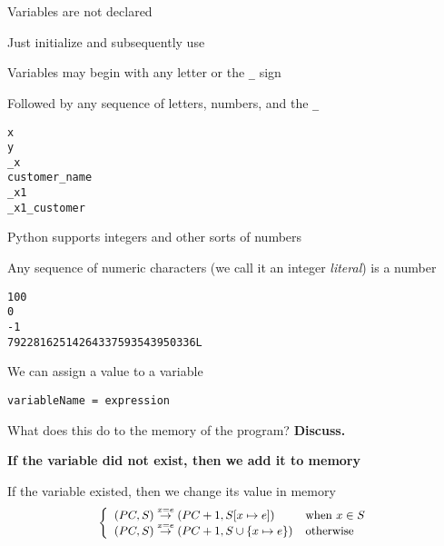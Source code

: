 \documentclass{beamer}
\begin{document}
\begin{slide}{
\item Variables are not declared
\item Just initialize and subsequently use
}\end{slide}

\begin{slide}{
\item Variables may begin with any letter or the \texttt{\_} sign
\item Followed by any sequence of letters, numbers, and the \texttt{\_}
}\end{slide}

\begin{frame}[fragile]
\begin{lstlisting}
x
y
_x
customer_name
_x1
_x1_customer
\end{lstlisting}
\end{frame}

\begin{slide}{
\item Python supports integers and other sorts of numbers
\item Any sequence of numeric characters (we call it an integer \textit{literal}) is a number
}\end{slide}

\begin{frame}[fragile]
\begin{lstlisting}
100
0
-1
79228162514264337593543950336L
\end{lstlisting}
\end{frame}

\begin{slide}{
\item We can assign a value to a variable
\item \texttt{variableName = expression}
\item What does this do to the memory of the program? \textbf{Discuss.}
\pause
\item \textbf{If the variable did not exist, then we add it to memory}
\item If the variable existed, then we change its value in memory 
$$
\small
\left\{
\begin{array}{ll}
(PC,S) \overset{x = e}{\rightarrow} (PC+1,S[x \mapsto e]) &\mathrm{when}~x \in S \\
(PC,S) \overset{x = e}{\rightarrow} (PC+1,S\cup\{x \mapsto e\}) &\mathrm{otherwise}\\
\end{array}
\right.
$$
}\end{slide}
\end{document}

